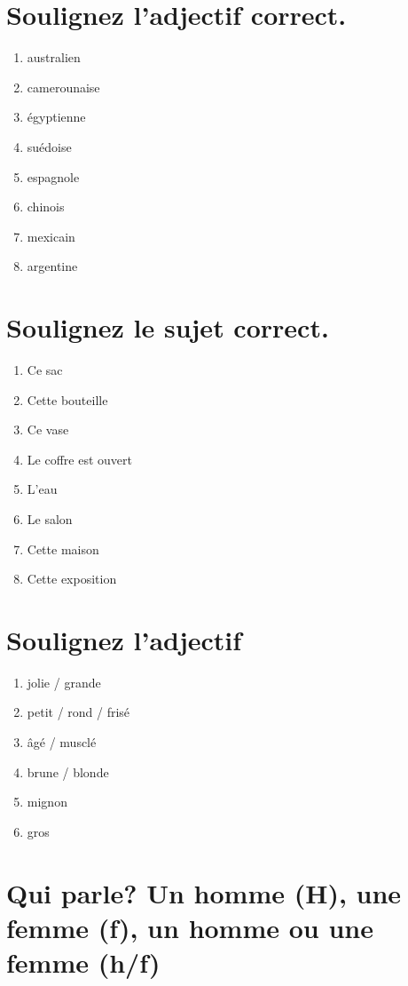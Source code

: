 \section{Soulignez l'adjectif correct.}

\begin{enumerate}
    \item australien
    \item camerounaise
    \item égyptienne
    \item suédoise
    \item espagnole
    \item chinois
    \item mexicain
    \item argentine
\end{enumerate}

\section{Soulignez le sujet correct.}

\begin{enumerate}
    \item Ce sac
    \item Cette bouteille
    \item Ce vase
    \item Le coffre est ouvert
    \item L'eau 
    \item Le salon
    \item Cette maison
    \item Cette exposition
\end{enumerate}

\section{Soulignez l'adjectif}

\begin{enumerate}
    \item jolie / grande
    \item petit / rond / frisé
    \item âgé / musclé
    \item brune / blonde
    \item mignon
    \item gros
\end{enumerate}

\section{Qui parle? Un homme (H), une femme (f), un homme ou une femme (h/f)}

